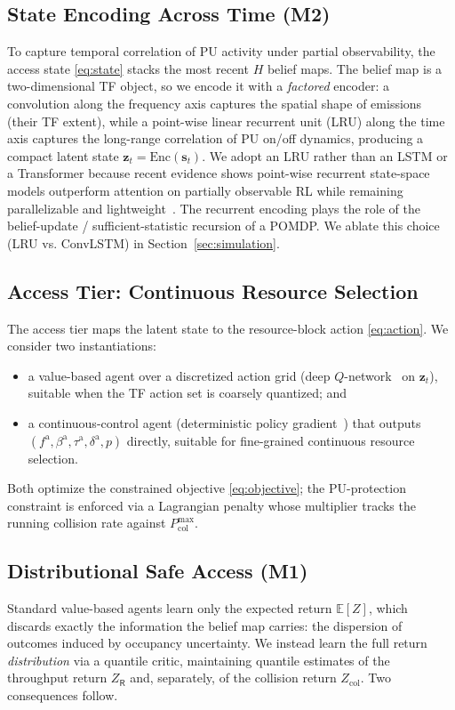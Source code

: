 \documentclass[journal]{IEEEtran}
\newcommand{\E}{\mathbb{E}}
\newcommand{\afc}{f^{\mathrm{a}}}          %
\newcommand{\aBW}{\beta^{\mathrm{a}}}      %
\newcommand{\ats}{\tau^{\mathrm{a}}}       %
\newcommand{\adur}{\delta^{\mathrm{a}}}    %
\newcommand{\pwr}{p}                       %
\newcommand{\state}{\bm{s}}                %
\newcommand{\histlen}{H}                   %
\newcommand{\Pcolmax}{P_{\mathrm{col}}^{\max}} %
\newcommand{\Zret}{Z}                       %
\newcommand{\Zcol}{Z_{\mathrm{col}}}        %
\newcommand{\Zthru}{Z_{\mathsf{R}}}         %
\begin{document}
\subsection{State Encoding Across Time (M2)}
\label{subsec:state_encoding}
To capture temporal correlation of PU activity under partial observability,
the access state \eqref{eq:state} stacks the most recent $\histlen$ belief
maps. The belief map is a two-dimensional TF object, so we encode it with a
\emph{factored} encoder: a convolution along the frequency axis captures the
spatial shape of emissions (their TF extent), while a point-wise linear
recurrent unit (LRU) along the time axis captures the long-range correlation
of PU on/off dynamics, producing a compact latent state
$\bm{z}_t = \mathrm{Enc}(\state_t)$. We adopt an LRU rather than an LSTM or a
Transformer because recent evidence shows point-wise recurrent state-space
models outperform attention on partially observable RL while remaining
parallelizable and lightweight~\cite{lu2024rethinking,morad2025cae}. The
recurrent encoding plays the role of the belief-update / sufficient-statistic
recursion of a POMDP. We ablate this choice (LRU vs. ConvLSTM) in
Section~\ref{sec:simulation}.

\subsection{Access Tier: Continuous Resource Selection}
\label{subsec:access_tier}
The access tier maps the latent state to the resource-block action
\eqref{eq:action}. We consider two instantiations:
\begin{itemize}
\item a value-based agent over a discretized action grid (deep $Q$-network~\cite{hausknecht2015drqn}
on $\bm{z}_t$), suitable when the TF action set is coarsely quantized; and
\item a continuous-control agent (deterministic policy gradient~\cite{lillicrap2016ddpg}) that
outputs $(\afc,\aBW,\ats,\adur,\pwr)$ directly, suitable for fine-grained
continuous resource selection.
\end{itemize}
Both optimize the constrained objective \eqref{eq:objective}; the
PU-protection constraint is enforced via a Lagrangian penalty whose
multiplier tracks the running collision rate against $\Pcolmax$.

\subsection{Distributional Safe Access (M1)}
\label{subsec:dist_rl}
Standard value-based agents learn only the expected return $\E[\Zret]$, which
discards exactly the information the belief map carries: the dispersion of
outcomes induced by occupancy uncertainty. We instead learn the full return
\emph{distribution} via a quantile critic, maintaining quantile estimates of
the throughput return $\Zthru$ and, separately, of the collision return
$\Zcol$. Two consequences follow.
\end{document}
